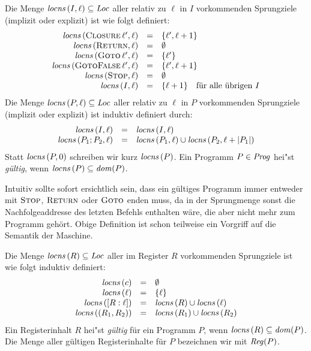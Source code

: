 \documentclass[12pt,fleqn,a4paper]{article}
\begin{document}
\begin{definition}
  Die Menge ${\text{\it locns\/}}\,(I,\ell)\subseteq{\text{\it Loc\/}}$ aller relativ zu $\ell$ in $I$ vorkommenden Sprungziele (implizit oder
  explizit) ist wie folgt definiert:
  \[\begin{array}{rcl}
    {\text{\it locns\/}}\,(\textsc{Closure}\,\ell',\ell) &=& \{\ell',\ell+1\} \\
    {\text{\it locns\/}}\,(\textsc{Return},\ell) &=& \emptyset \\
    {\text{\it locns\/}}\,(\textsc{Goto}\,\ell',\ell) &=& \{\ell'\} \\
    {\text{\it locns\/}}\,(\textsc{GotoFalse}\,\ell',\ell) &=& \{\ell',\ell+1\} \\
    {\text{\it locns\/}}\,(\textsc{Stop},\ell) &=& \emptyset \\
    {\text{\it locns\/}}\,(I,\ell) &=& \{\ell+1\} \quad \text{f\"ur alle \"ubrigen $I$}
  \end{array}\]
  Die Menge ${\text{\it locns\/}}\,(P,\ell)\subseteq{\text{\it Loc\/}}$ aller relativ zu $\ell$ in $P$ vorkommenden Sprungziele (implizit oder
  explizit) ist induktiv definiert durch:
  \[\begin{array}{rcl}
    {\text{\it locns\/}}\,(I,\ell) &=& {\text{\it locns\/}}\,(I,\ell) \\
    {\text{\it locns\/}}\,(P_1;P_2,\ell) &=& {\text{\it locns\/}}\,(P_1,\ell) \cup {\text{\it locns\/}}\,(P_2,\ell+|P_1|)
  \end{array}\]
  Statt ${\text{\it locns\/}}\,(P,0)$ schreiben wir kurz ${\text{\it locns\/}}\,(P)$.
  Ein Programm $P\in{\text{\it Prog\/}}$ hei"st {\em g\"ultig}, wenn ${\text{\it locns\/}}\,(P) \subseteq {\text{\it dom\/}}(P)$.
\end{definition}

Intuitiv sollte sofort ersichtlich sein, dass ein g\"ultiges Programm immer entweder mit $\textsc{Stop}$,
$\textsc{Return}$ oder $\textsc{Goto}$ enden muss, da in der Sprungmenge sonst die Nachfolgeaddresse des
letzten Befehls enthalten w\"are, die aber nicht mehr zum Programm geh\"ort. Obige Definition ist schon
teilweise ein Vorgriff auf die Semantik der Maschine.

\begin{definition}
  Die Menge ${\text{\it locns\/}}\,(R) \subseteq {\text{\it Loc\/}}$ aller im Register $R$ vorkommenden Sprungziele ist wie folgt induktiv
  definiert:
  \[\begin{array}{rcl}
    {\text{\it locns\/}}\,(c) &=& \emptyset \\
    {\text{\it locns\/}}\,(\ell) &=& \{\ell\} \\
    {\text{\it locns\/}}\,([R:\ell]) &=& {\text{\it locns\/}}\,(R) \cup {\text{\it locns\/}}\,(\ell) \\
    {\text{\it locns\/}}\,((R_1,R_2)) &=& {\text{\it locns\/}}\,(R_1) \cup {\text{\it locns\/}}\,(R_2)
  \end{array}\]
  Ein Registerinhalt $R$ hei"st {\em g\"ultig} f\"ur ein Programm $P$, wenn ${\text{\it locns\/}}\,(R)\subseteq{\text{\it dom\/}}(P)$. Die Menge
  aller g\"ultigen Registerinhalte f\"ur $P$ bezeichnen wir mit ${\text{\it Reg\/}}(P)$.
\end{definition}
\end{document}
